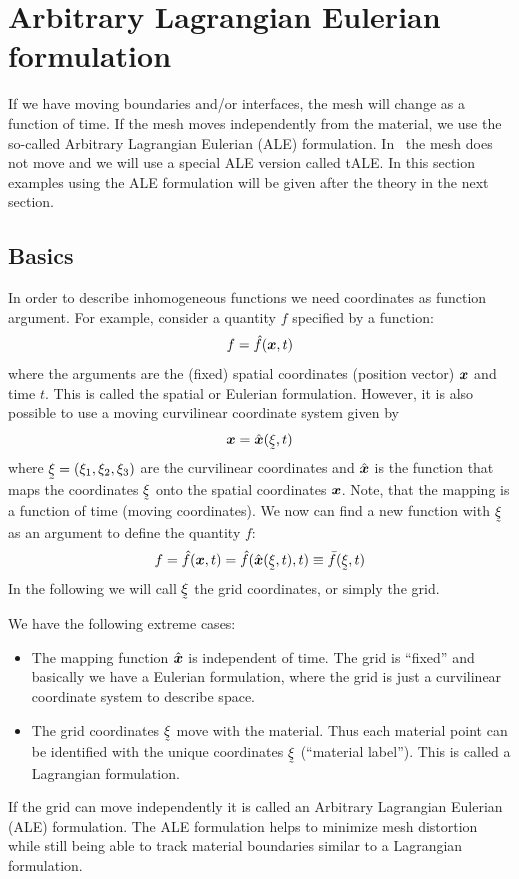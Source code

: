 
\def\headdate{27th July 2023}

\section{Arbitrary Lagrangian Eulerian formulation}
\label{sec:ale}

If we have moving boundaries and/or interfaces, the mesh will change as a
function of time. If the mesh moves independently from the material, we
use the so-called Arbitrary Lagrangian Eulerian (ALE)
formulation. In \xfem\ the mesh does not move and
we will use a special ALE version called tALE.
In this section examples using the ALE
formulation will be given after the theory in the next section.

\subsection{Basics}

In order to describe inhomogeneous functions we need coordinates as function
argument. For example, consider a quantity $f$ specified by a function:
\begin{equation}
 f=\hat f(\boldsymbol{x},t)
\end{equation}
where the arguments are the
(fixed) spatial coordinates (position vector) $\boldsymbol{x}$ and time $t$. This is
called the spatial or Eulerian formulation. However, it is also possible to use
a moving curvilinear coordinate system given by
\begin{equation}
   \vek x = \hat{\vek x}(\col\xi,t)
    \label{eq:mappingxi}
\end{equation}
where $\col\xi=(\xi_1,\xi_2,\xi_3)$ are the curvilinear coordinates and
$\hat{\boldsymbol{x}}$ is the function that maps the coordinates $\col\xi$ onto the
spatial coordinates $\boldsymbol{x}$. Note, that the mapping is a function of time
(moving coordinates). We now can find a new function
with $\col\xi$ as an argument to define the quantity $f$:
\begin{equation}
   f=\hat f(\vek x,t)=\hat f(\hat{\vek x}(\col\xi,t),t)\equiv \bar
f(\col\xi,t)
  \label{eq:fexpr}
\end{equation}
In the following we will call $\col\xi$ the grid coordinates, or simply the
grid.

We have the following extreme cases:
\begin{itemize}
   \item The mapping function $\hat{\boldsymbol{x}}$ is independent of time. The grid is
``fixed'' and basically we have a Eulerian formulation, where the grid is just
a curvilinear coordinate system to describe space.
   \item The grid coordinates $\col\xi$ move with the material. Thus each
material point can be identified with the unique coordinates $\col\xi$
(``material label''). This is called a Lagrangian formulation.
\end{itemize}
If the grid can move independently it is called an Arbitrary Lagrangian
Eulerian (ALE) formulation. The ALE formulation helps to minimize mesh
distortion while still
being able to track material boundaries similar to a Lagrangian
formulation.

